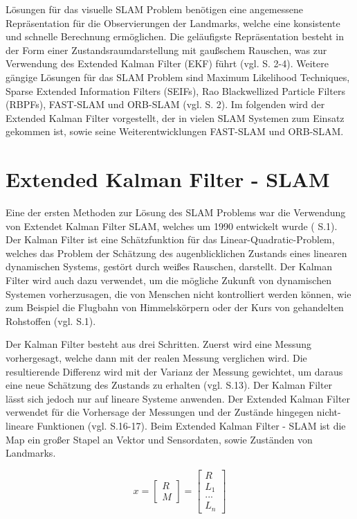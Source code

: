 Lösungen für das visuelle SLAM Problem benötigen eine angemessene Repräsentation für die Observierungen der Landmarks, welche eine konsistente und schnelle Berechnung ermöglichen. Die geläufigste Repräsentation besteht in der Form einer Zustandsraumdarstellung mit gaußschem Rauschen, was zur Verwendung des \glqq Extended Kalman Filter\grqq{} (EKF) führt (vgl. \cite{slam} S. 2-4). Weitere gängige Lösungen für das SLAM Problem sind \glqq Maximum Likelihood Techniques\grqq{}, \glqq Sparse Extended Information Filters\grqq{} (SEIFs), \glqq Rao Blackwellized Particle Filters\grqq{} (RBPFs), \glqq FAST-SLAM\grqq{} und \glqq ORB-SLAM\grqq{} (vgl. \cite{rao} S. 2). Im folgenden wird der Extended Kalman Filter vorgestellt, der in vielen SLAM Systemen zum Einsatz gekommen ist, sowie seine Weiterentwicklungen FAST-SLAM und ORB-SLAM.
  
 

\section{Extended Kalman Filter - SLAM}
Eine der ersten Methoden zur Lösung des SLAM Problems war die Verwendung von Extendet Kalman Filter SLAM, welches um 1990 entwickelt wurde (\cite{orb_slam} S.1). Der Kalman Filter ist eine Schätzfunktion für das \glqq Linear-Quadratic-Problem\grqq{}, welches das Problem der Schätzung des augenblicklichen Zustands eines linearen dynamischen Systems, gestört durch weißes Rauschen, darstellt. Der Kalman Filter wird auch dazu verwendet, um die mögliche Zukunft von dynamischen Systemen vorherzusagen, die von Menschen nicht kontrolliert werden können, wie zum Beispiel die Flugbahn von Himmelskörpern oder der Kurs von gehandelten Rohstoffen (vgl. \cite{ekf} S.1).

Der Kalman Filter besteht aus drei Schritten. Zuerst wird eine Messung vorhergesagt, welche dann mit der realen Messung verglichen wird. Die resultierende Differenz wird mit der Varianz der Messung gewichtet, um daraus eine neue Schätzung des Zustands zu erhalten (vgl. \cite{slam_studi} S.13). Der Kalman Filter lässt sich jedoch nur auf lineare Systeme anwenden. Der Extended Kalman Filter verwendet für die Vorhersage der Messungen und der Zustände hingegen nicht-lineare Funktionen (vgl. \cite{slam_studi} S.16-17). Beim Extended Kalman Filter - SLAM ist die Map ein großer Stapel an Vektor und Sensordaten, sowie Zuständen von Landmarks.

\begin{equation}
  x =  \begin{bmatrix}
		R\\
		M
     	\end{bmatrix}
     = \begin{bmatrix}
		R\\
		L_1\\
		...\\
		L_n
     	\end{bmatrix}
\end{equation}

